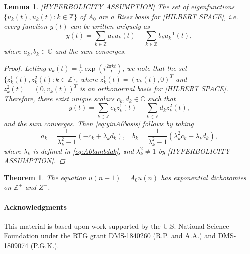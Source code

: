 \documentclass[12pt,reqno]{amsart}
\def\C{{\mathbb C}}
\def\Z{{\mathbb Z}}
\newtheorem{lemma}{Lemma}
\newtheorem{theorem}{Theorem}
\begin{document}
\begin{lemma}\label{eq:A0basis}
[HYPERBOLICITY ASSUMPTION]
The set of eigenfunctions $\{ u_k(t), u_k(t) : k \in \Z \}$ of $A_0$ are a Riesz basis for [HILBERT SPACE], i.e. every function $y(t)$ can be written uniquely as
\begin{equation}\label{eq:yinA0basis}
y(t) = \sum_{k \in \Z} a_k u_k(t) + \sum_{k \in \Z} b_k u^{-1}_k(t),
\end{equation}
where $a_k, b_k \in \C$ and the sum converges.
\begin{proof}
Letting $v_k(t) = \frac{1}{T} \exp\left( i \frac{2 \pi k t}{T} \right)$, we note that the set $\{ z^1_k(t), z^2_k(t) : k \in \Z \}$, where $z^1_k(t) = (v_k(t), 0)^T$ and $z^2_k(t) = (0, v_k(t))^T$ is an orthonormal basis for [HILBERT SPACE]. Therefore, there exist unique scalars $c_k, d_k \in \C$ such that
\begin{equation*}
y(t) = \sum_{k \in \Z} c_k z^1_k(t) + \sum_{k \in \Z} d_k z^2_k(t),
\end{equation*}
and the sum converges. Then \cref{eq:yinA0basis} follows by taking
\[
a_k = \frac{1}{\lambda_k^2 - 1}\left(-c_k + \lambda_k d_k \right), \quad
b_k = \frac{1}{\lambda_k^2 - 1}\left( \lambda_k^2 c_k - \lambda_k d_k \right),
\]
where $\lambda_k$ is defined in \cref{eq:A0lambdak}, and $\lambda_k^2 \neq 1$ by [HYPERBOLICITY ASSUMPTION].
\end{proof}
\end{lemma}

\begin{theorem}The equation $u(n+1) = A_0 u(n)$ has exponential dichotomies on $\Z^+$ and $Z^-$.
\end{theorem}




\paragraph{Acknowledgments}

This material is based upon work supported by the U.S. National Science Foundation under the RTG grant DMS-1840260 (R.P. and A.A.)
and DMS-1809074 (P.G.K.).



\end{document}
